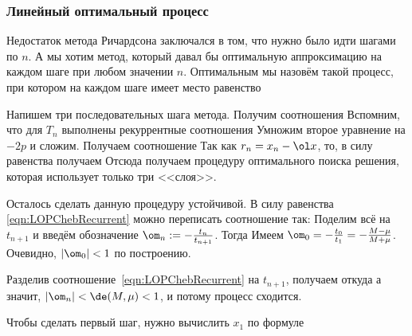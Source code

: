 \documentclass[a4paper]{article}
\begin{document}
\subsubsection{Линейный оптимальный процесс}

Недостаток метода Ричардсона заключался в том, что нужно было идти
шагами по $n$. А мы хотим метод, который давал бы оптимальную
аппроксимацию на каждом шаге при любом значении $n$. Оптимальным мы
назовём такой процесс, при котором на каждом шаге имеет место
равенство 

Напишем три последовательных шага метода. Получим соотношения
 Вспомним, что для
$T_n$ выполнены рекуррентные соотношения   Умножим второе уравнение на $-2p$ и сложим.
Получаем соотношение   Так как $r_n =
x_n - \ol x$, то, в силу равенства
 получаем   Отсюда получаем процедуру оптимального поиска
решения, которая использует только три <<слоя>>.

Осталось сделать данную процедуру устойчивой. В силу равенства
\eqref{eqn:LOPChebRecurrent} можно переписать соотношение так:
Поделим всё на $t_{n+1}$ и введём обозначение $\om_n :=
-\frac{t_n}{t_{n+1}}$.  Тогда   Имеем $\om_0 = -\frac{t_0}{t_1} = -\frac{M-\mu}{M+\mu}$.
Очевидно, $|\om_0| < 1$ по построению.

Разделив соотношение~\eqref{eqn:LOPChebRecurrent} на $t_{n+1}$,
получаем 
откуда  а
значит, $|\om_n| < \de(M, \mu) < 1$, и потому процесс сходится.

Чтобы сделать первый шаг, нужно вычислить $x_1$ по формуле 
\end{document}
